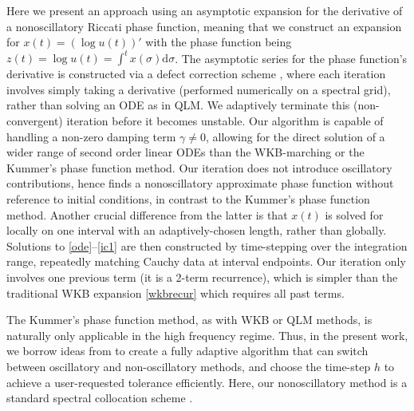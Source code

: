 \documentclass[10pt]{article}
\renewcommand{\d}{\mathrm{d}} %
\newcommand{\g}{\gamma}
\begin{document}
Here we present an approach using an asymptotic expansion for the derivative of
a nonoscillatory Riccati phase function, meaning that we construct an expansion
for $x(t) = (\log u(t))'$ with the phase function being $z(t) = \log u(t) =
\int^t x(\sigma)\d \sigma$.
The asymptotic series for the phase function's derivative is constructed
via a defect
correction scheme \cite{bohmer1984},
where each iteration involves simply taking a derivative
(performed numerically on a spectral grid), rather than solving
an ODE as in QLM.
We adaptively terminate this (non-convergent) iteration before it becomes unstable.
%
Our algorithm is capable of handling a non-zero damping term $\g \neq 0$,
allowing for the direct solution of a wider range of second order linear ODEs
than the WKB-marching or the Kummer's phase function method.
%
Our iteration does not introduce oscillatory contributions,
hence finds a nonoscillatory approximate phase function without
reference to initial conditions, in contrast to the
Kummer's phase function method. 
%
Another crucial difference from the latter is that $x(t)$ is solved for
locally on one interval with an adaptively-chosen length, rather than globally.
Solutions to \cref{ode}--\cref{ic1} are then constructed by time-stepping over the
integration range, repeatedly matching Cauchy data at interval endpoints.
%
Our iteration only involves one previous term (it is a 2-term recurrence),
which is simpler than the traditional WKB expansion
\cref{wkbrecur} which requires all past terms.
%
%

%
The Kummer's phase function method, as with WKB or QLM methods,
is naturally only applicable in the high frequency regime.
Thus, in the present work, we borrow ideas from \cite{agocs2020efficient} to
create a fully adaptive algorithm that can switch 
between oscillatory and non-oscillatory methods,
and choose the time-step $h$ to achieve a user-requested
tolerance efficiently.
Here, our nonoscillatory method is a standard spectral collocation scheme
\cite{tref}.  %
\end{document}
